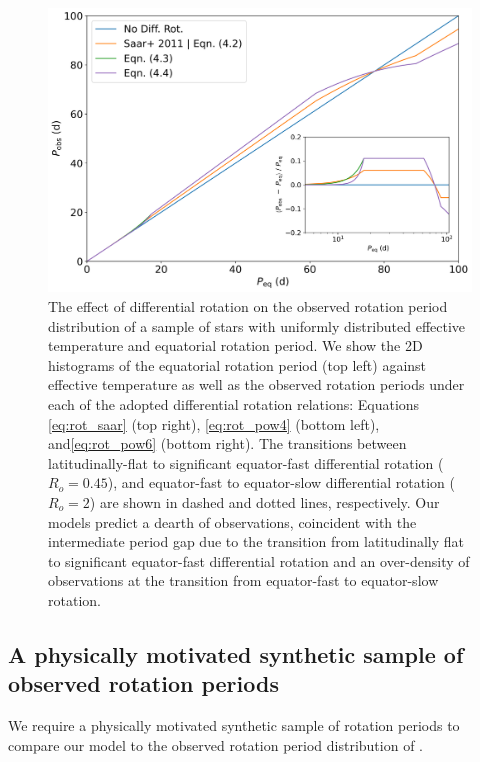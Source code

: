 \begin{figure}
\centering
 \includegraphics[width=\textwidth]{Figures/rot_gap_figures/comparison_observed_rot_periods.png}
 \caption[The effect of differential rotation on the observed rotation period distribution.]{The effect of differential rotation on the observed rotation period distribution of a sample of stars with uniformly distributed effective temperature and equatorial rotation period. We show the 2D histograms of the equatorial rotation period (top left) against effective temperature as well as the observed rotation periods under each of the adopted differential rotation relations: Equations \ref{eq:rot_saar} (top right), \ref{eq:rot_pow4} (bottom left), and\ref{eq:rot_pow6} (bottom right). The transitions between latitudinally-flat to significant equator-fast differential rotation ($R_o = 0.45$), and equator-fast to equator-slow differential rotation ($R_o = 2$) are shown in dashed and dotted lines, respectively. Our models predict a dearth of observations, coincident with the intermediate period gap due to the transition from latitudinally flat to significant equator-fast differential rotation and an over-density of observations at the transition from equator-fast to equator-slow rotation.}
 \label{fig:create_gap}
\end{figure}

\subsection{A physically motivated synthetic sample of observed rotation periods}

We require a physically motivated synthetic sample of rotation periods to compare our model to the observed rotation period distribution of \citet{mcquillan_rotation_2014}.

